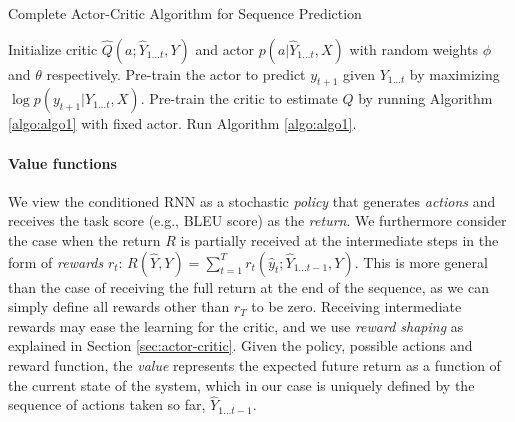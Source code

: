\documentclass{article} \usepackage{iclr2017_conference,times}
\begin{document}
\begin{algorithm}
    \caption{Complete Actor-Critic Algorithm for Sequence Prediction}
    \label{algo:algo2}
    \begin{algorithmic}[1]
    \STATE 
        Initialize critic $\hat{Q}(a;\hat{Y}_{1 \ldots t}, Y)$
        and actor $p(a|\hat{Y}_{1 \ldots t}, X)$ with
        random weights $\phi$ and $\theta$ respectively.
    \STATE 
        Pre-train the actor to predict $y_{t+1}$ given 
        $Y_{1 \ldots t}$ by maximizing 
        $\log p(y_{t+1}|Y_{1 \ldots t}, X)$.
    \STATE 
        Pre-train the critic to estimate $Q$ by running Algorithm \ref{algo:algo1}
        with fixed actor.
    \STATE
        Run Algorithm \ref{algo:algo1}.
    \end{algorithmic}
\end{algorithm}



\paragraph{Value functions}

We view the conditioned RNN as a stochastic \textit{policy}
that generates \textit{actions}
and receives the task score (e.g., BLEU score)  as the \textit{return}.  
We furthermore consider the case when
the return $R$ is partially received at the intermediate steps 
in the form of \textit{rewards} $r_t$:  $R(\hat{Y}, Y) =
\sum_{t=1}^T r_t(\hat{y}_t;\hat{Y}_{1 \ldots t-1}, Y)$.  This
is more general than the case of receiving the full return at the end of the sequence, 
as we can simply define all rewards other than $r_T$ to be zero.
Receiving intermediate rewards may ease the learning for the critic, and we use
\emph{reward shaping} as explained in Section \ref{sec:actor-critic}. 
Given the policy, possible actions and reward function, the \emph{value} represents the
expected future return as a function of the
current state of the system, which in our case is uniquely defined by the
sequence of actions taken so far, $\hat{Y}_{1 \ldots t-1}$.
\end{document}
